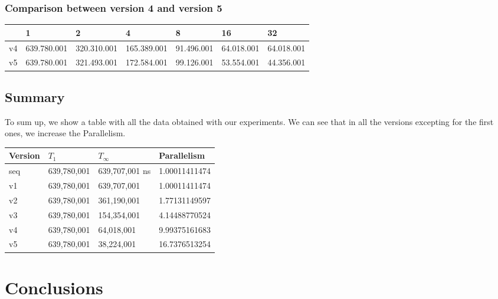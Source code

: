 \documentclass[12]{article}
\begin{document}
\subsubsection{Comparison between version 4 and version 5}
\begin{table}[h]
\begin{tabular}{l|l|l|l|l|l|l|}
\cline{2-7}
                         & 1           & 2           & 4           & 8          & 16         & 32         \\ \hline
\multicolumn{1}{|l|}{v4} & 639.780.001 & 320.310.001 & 165.389.001 & 91.496.001 & 64.018.001 & 64.018.001 \\ \hline
\multicolumn{1}{|l|}{v5} & 639.780.001 & 321.493.001 & 172.584.001 & 99.126.001 & 53.554.001 & 44.356.001 \\ \hline
\end{tabular}
\end{table}



\subsection{Summary}

To sum up, we show a table with all the data obtained with our experiments. We can see that in all the versions excepting for the first ones, we increase the Parallelism.
\\
\medskip
\begin{table}[h]
\centering
\begin{tabular}{|l|l|l|l|}
\hline
Version & $T_1 $ & $T_\infty$ & Parallelism \\ \hline
seq     & 639,780,001   & 639,707,001 ns   &        1.00011411474     \\ \hline
v1      &  639,780,001  & 639,707,001  &         1.00011411474      \\ \hline
v2      & 639,780,001   & 361,190,001   &      1.77131149597      \\ \hline
v3      & 639,780,001   & 154,354,001&         4.14488770524    \\ \hline
v4      & 639,780,001   &  64,018,001   &        9.99375161683     \\ \hline
v5      &639,780,001     & 38,224,001  &        16.7376513254    \\ \hline
\end{tabular}
\end{table}





\section{Conclusions}
\end{document}
